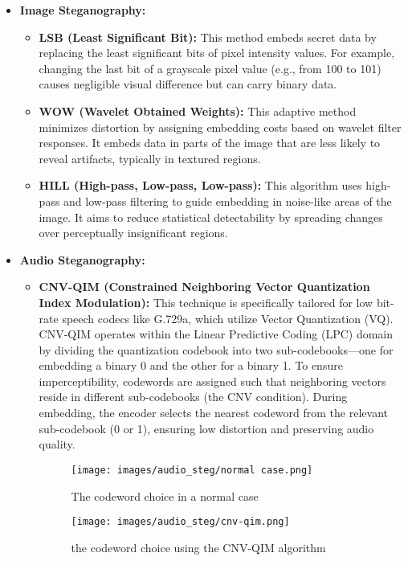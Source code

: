 \documentclass[12pt]{article}
\begin{document}
\begin{itemize}
  \item \textbf{Image Steganography:}
  \begin{itemize}
    \item \textbf{LSB (Least Significant Bit):} This method embeds secret data by replacing the least significant bits of pixel intensity values. For example, changing the last bit of a grayscale pixel value (e.g., from 100 to 101) causes negligible visual difference but can carry binary data.
    
    \item \textbf{WOW (Wavelet Obtained Weights):} This adaptive method minimizes distortion by assigning embedding costs based on wavelet filter responses. It embeds data in parts of the image that are less likely to reveal artifacts, typically in textured regions.

    \item \textbf{HILL (High-pass, Low-pass, Low-pass):} This algorithm uses high-pass and low-pass filtering to guide embedding in noise-like areas of the image. It aims to reduce statistical detectability by spreading changes over perceptually insignificant regions.
  \end{itemize}
  
  \item \textbf{Audio Steganography:}
  \begin{itemize}
    \item \textbf{CNV-QIM (Constrained Neighboring Vector Quantization Index Modulation):} This technique is specifically tailored for low bit-rate speech codecs like G.729a, which utilize Vector Quantization (VQ). CNV-QIM operates within the Linear Predictive Coding (LPC) domain by dividing the quantization codebook into two sub-codebooks—one for embedding a binary 0 and the other for a binary 1. To ensure imperceptibility, codewords are assigned such that neighboring vectors reside in different sub-codebooks (the CNV condition). During embedding, the encoder selects the nearest codeword from the relevant sub-codebook (0 or 1), ensuring low distortion and preserving audio quality.

    \begin{figure}[H]
    \centering
    \begin{minipage}[b]{0.45\textwidth}
        \centering
        \texttt{[image: images/audio\_steg/normal case.png]}
        \caption{The codeword choice in a normal case}
    \end{minipage}
    \hfill
    \begin{minipage}[b]{0.45\textwidth}
        \centering
        \texttt{[image: images/audio\_steg/cnv-qim.png]}
        \caption{the codeword choice using the CNV-QIM algorithm}
    \end{minipage}
    \end{figure}    



\end{itemize}
\end{itemize}
\end{document}

